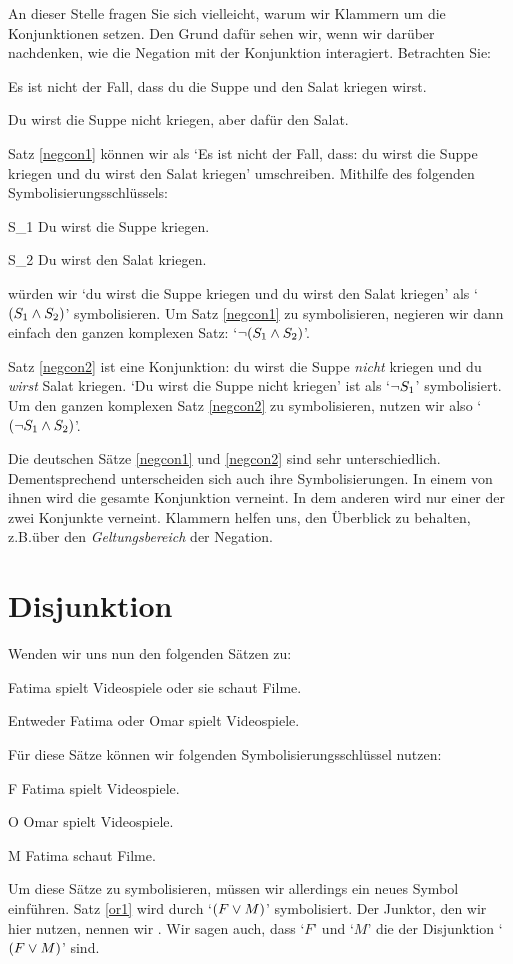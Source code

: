 An dieser Stelle fragen Sie sich vielleicht, warum wir Klammern um die Konjunktionen setzen. Den Grund dafür sehen wir, wenn wir darüber nachdenken, wie die Negation mit der Konjunktion interagiert. Betrachten Sie:
	\begin{earg}
		\item[\ex{negcon1}] Es ist nicht der Fall, dass du die Suppe und den Salat kriegen wirst.
		\item[\ex{negcon2}] Du wirst die Suppe nicht kriegen, aber dafür den Salat.
	\end{earg}
Satz \ref{negcon1} können wir als `Es ist nicht der Fall, dass: du wirst die Suppe kriegen und du wirst den Salat kriegen' umschreiben. Mithilfe des folgenden Symbolisierungsschlüssels:
	\begin{ekey}
		\item[S_1] Du wirst die Suppe kriegen.
		\item[S_2] Du wirst den Salat kriegen.
	\end{ekey}
würden wir `du wirst die Suppe kriegen und du wirst den Salat kriegen' als `$(S_1 \wedge S_2)$' symbolisieren. Um Satz \ref{negcon1} zu symbolisieren, negieren wir dann einfach den ganzen komplexen Satz: `$\neg (S_1 \wedge S_2)$'. 

Satz \ref{negcon2} ist eine Konjunktion: du wirst die Suppe \emph{nicht} kriegen und du \emph{wirst} Salat kriegen. `Du wirst die Suppe nicht kriegen' ist als `$\neg S_1$' symbolisiert. Um den ganzen komplexen Satz \ref{negcon2} zu symbolisieren, nutzen wir also `$(\neg S_1 \wedge S_2)$'. 

Die deutschen Sätze \ref{negcon1} und \ref{negcon2} sind sehr unterschiedlich. Dementsprechend unterscheiden sich auch ihre Symbolisierungen. In einem von ihnen wird die gesamte Konjunktion verneint. In dem anderen wird nur einer der zwei Konjunkte verneint. Klammern helfen uns, den Überblick zu behalten, z.B.\@ über den \emph{Geltungsbereich} der Negation. 

\section{Disjunktion}

Wenden wir uns nun den folgenden Sätzen zu:
	\begin{earg}
		\item[\ex{or1}]Fatima spielt Videospiele oder sie schaut Filme.
		\item[\ex{or2}]Entweder Fatima oder Omar spielt Videospiele. 
	\end{earg}
Für diese Sätze können wir folgenden Symbolisierungsschlüssel nutzen:
	\begin{ekey}
		\item[F] Fatima spielt Videospiele.
		\item[O] Omar spielt Videospiele.
		\item[M] Fatima schaut Filme.
	\end{ekey}
Um diese Sätze zu symbolisieren, müssen wir allerdings ein neues Symbol einführen. Satz \ref{or1} wird durch `$(F \vee M)$' symbolisiert. Der Junktor, den wir hier nutzen, nennen wir . Wir sagen auch, dass `$F$' und `$M$' die  der Disjunktion `$(F \vee M)$' sind.

